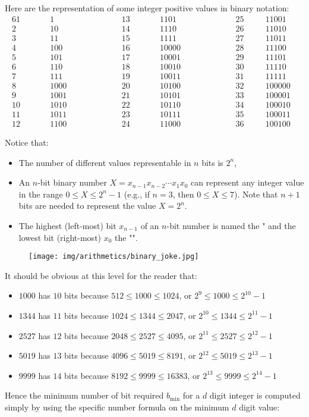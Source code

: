 	Here are the representation of some integer positive values in binary notation:
	\begin{alignat*}{6}
	1&\qquad&1& \qquad\quad\qquad&  13&\qquad&1101&\qquad\quad\qquad &25&\quad&11001&\\
	2&&10&&  14&&1110&&   26&&11010&\\
	3&&11&&  15&&1111&&   27&&11011&\\
	4&&100&& 16&&10000&&   28&&11100&\\
	5&&101&& 17&&10001&&   29&&11101&\\
	6&&110&& 18&&10010&&   30&&11110&\\
	7&&111&& 19&&10011&&   31&&11111&\\
	8&&1000&&20&&10100&&  32&&100000&\\
	9&&1001&&21&&10101&&  33&&100001&\\
	10&&1010&&22&&10110&& 34&&100010&\\
	11&&1011&&23&&10111&& 35&&100011&\\
	12&&1100&&24&&11000&& 36&&100100&
	\end{alignat*}

	Notice that:
	\begin{itemize}
		\item The  number of different values representable in $n$ bits is  $2^n$,
		
		\item An $n$-bit binary number $X=x_{n-1}x_{n-2}\cdots x_1 x_0$ can represent  any integer value in the range $0 \le X \le 2^n-1$ (e.g., if $n=3$,  then $0 \le X \le 7$). Note that $n+1$ bits are needed to represent the value $X=2^n$.
		
		\item The highest (left-most) bit $x_{n-1}$ of an $n$-bit number is named the " and the lowest bit (right-most) $x_0$ the "".
	\end{itemize}
	\begin{figure}[H]
		\centering
		\texttt{[image: img/arithmetics/binary\_joke.jpg]}
	\end{figure}
	It should be obvious at this level for the reader that:
	\begin{itemize}
		\item $1000$ has $10$ bits because $512\leq 1000\leq 1024$, or $2^9\leq 1000\leq 2^{10}-1$
		\item $1344$ has $11$ bits because $1024\leq 1344 \leq 2047$, or $2^{10}\leq 1344\leq 2^{11}-1$
		\item $2527$ has $12$ bits because $2048\leq 2527\leq 4095$, or $2^{11}\leq 2527\leq 2^{12}-1$
		\item $5019$ has $13$ bits because $4096\leq 5019\leq 8191$, or $2^{12}\leq 5019\leq 2^{13}-1$
		\item $9999$ has $14$ bits because $8192\leq 9999\leq 16383$, or $2^{13}\leq 9999\leq 2^{14}-1$
	\end{itemize}
	Hence the minimum number of bit required $b_\mathrm{min}$ for a $d$ digit integer is computed simply by using the specific number formula on the minimum $d$ digit value:
	
